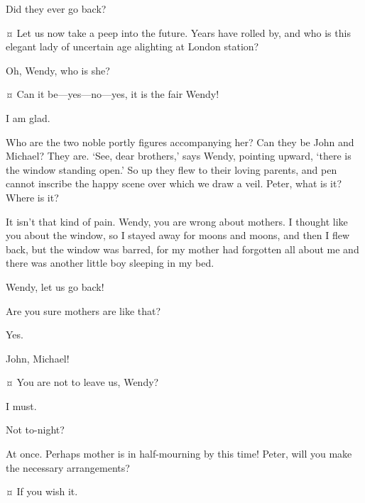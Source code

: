 \begin{drama}

\firsttwinspeaks
Did they ever go back?

\wendyspeaks {}¤
Let us now take a peep into the future.
Years have rolled by, and who is this elegant lady of uncertain age alighting at London station?


\nibsspeaks
Oh, Wendy, who is she?

\wendyspeaks {}¤
Can it be—yes—no—yes, it is the fair Wendy!

\tootlesspeaks
I am glad.

\wendyspeaks
Who are the two noble portly figures accompanying her?
Can they be John and Michael?
They are.
‘See, dear brothers,’ says Wendy, pointing upward, ‘there is the window standing open.’
So up they flew to their loving parents, and pen cannot inscribe the happy scene over which we draw a veil.
Peter, what is it?
Where is it?

\peterspeaks
It isn’t that kind of pain.
Wendy, you are wrong about mothers.
I thought like you about the window, so I stayed away for moons and moons,
and then I flew back, but the window was barred,
for my mother had forgotten all about me and there was another little boy sleeping in my bed.


\johnspeaks
Wendy, let us go back!

\wendyspeaks
Are you sure mothers are like that?

\peterspeaks
Yes.

\wendyspeaks
John, Michael!

\firsttwinspeaks {}¤
You are not to leave us, Wendy?

\wendyspeaks
I must.

\nibsspeaks
Not to-night?

\wendyspeaks
At once.
Perhaps mother is in half-mourning by this time!
Peter, will you make the necessary arrangements?


\peterspeaks {}¤
If you wish it.


\end{drama}
